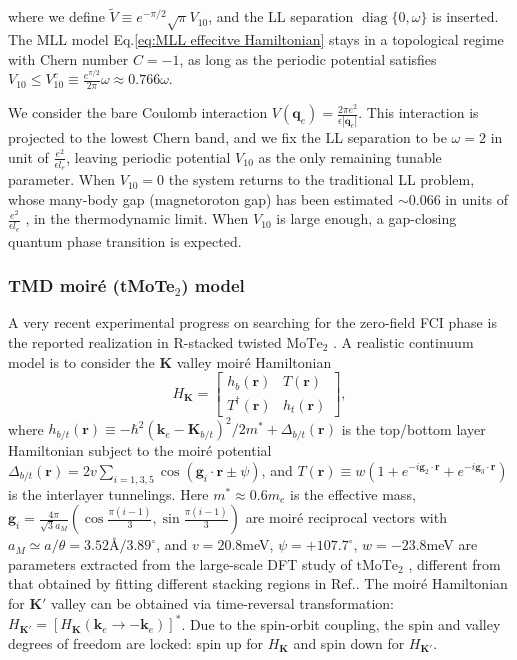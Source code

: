 where we define $\widetilde{V}\equiv e^{-\pi/2}\sqrt{\pi}V_{10}$, and the LL separation $\mathop{\mathrm{diag}}\{0, \omega\}$ is inserted. The MLL model Eq.\eqref{eq:MLL effecitve Hamiltonian} stays in a topological regime with Chern number $C=-1$, as long as the periodic potential satisfies $V_{10}\leq V_{10}^c\equiv\frac{e^{\pi/2}}{2\pi}\omega\approx0.766\omega$.

We consider the bare Coulomb interaction $V(\mathbf{q}_e)=\frac{2\pi e^2}{\epsilon |\mathbf{q}_e|}$. This interaction is projected to the lowest Chern band, and we fix the LL separation to be $\omega=2$ in unit of $\frac{e^2}{\epsilon l_e}$, leaving periodic potential $V_{10}$ as the only remaining tunable parameter. When $V_{10}=0$ the system returns to the traditional LL problem, whose many-body gap (magnetoroton gap) has been estimated $\sim 0.066$ in units of $\frac{e^2}{\epsilon l_e}$ \cite{balram2017positions}, in the thermodynamic limit. When $V_{10}$ is large enough, a gap-closing quantum phase transition is expected.


\subsubsection{TMD moiré (tMoTe$_2$) model}
A very recent experimental progress on searching for the zero-field FCI phase is the reported realization in R-stacked twisted $\mathrm{MoTe_2}$ \cite{cai2023signatures,zeng2023thermodynamic,park2023observation}. A realistic continuum model is to consider the $\mathbf{K}$ valley moir\'e Hamiltonian \cite{wu2019topological,wang2023fractional}
\begin{equation}\label{eq: tMoTe2 moiré Hamiltonian}
    H_\mathbf{K}=\begin{bmatrix}
        h_b(\bm r)       & T(\bm r)   \\
        T^\dagger(\bm r) & h_t(\bm r)
    \end{bmatrix},
\end{equation}
where $h_{b/t}(\bm r)\equiv-\hbar^2(\mathbf k_e-\mathbf K_{b/t})^2/2m^*+\Delta_{b/t}(\bm r)$ is the top/bottom layer Hamiltonian subject to the moir\'e potential $\Delta_{b/t}(\bm r)=2v\sum_{i=1,3,5}\cos(\mathbf g_i\cdot\bm r\pm\psi)$, and $T(\bm r)\equiv w(1+e^{-i\mathbf g_2\cdot\bm r}+e^{-i\mathbf g_3\cdot\bm r})$ is the interlayer tunnelings. Here $m^*\approx0.6m_e$ is the effective mass, $\mathbf g_i=\frac{4\pi}{\sqrt{3}a_M}(\cos\frac{\pi(i-1)}{3}, \sin\frac{\pi(i-1)}{3})$ are moir\'e reciprocal vectors with $a_M\simeq a/\theta=3.52\text{\AA}/3.89^\circ$, and $v=20.8$meV, $\psi=+107.7^\circ$, $w=-23.8$meV are parameters extracted from the large-scale DFT study of $\mathrm{tMoTe_2}$ \cite{wang2023fractional}, different from that obtained by fitting different stacking regions in Ref.\cite{wu2019topological}. The moir\'e Hamiltonian for $\mathbf{K'}$ valley can be obtained via time-reversal transformation: $H_{\mathbf{K'}}=[H_\mathbf{K}(\mathbf k_e\rightarrow -\mathbf k_e)]^*$. Due to the spin-orbit coupling, the spin and valley degrees of freedom are locked: spin up for $H_\mathbf{K}$ and spin down for $H_{\mathbf{K'}}$.



